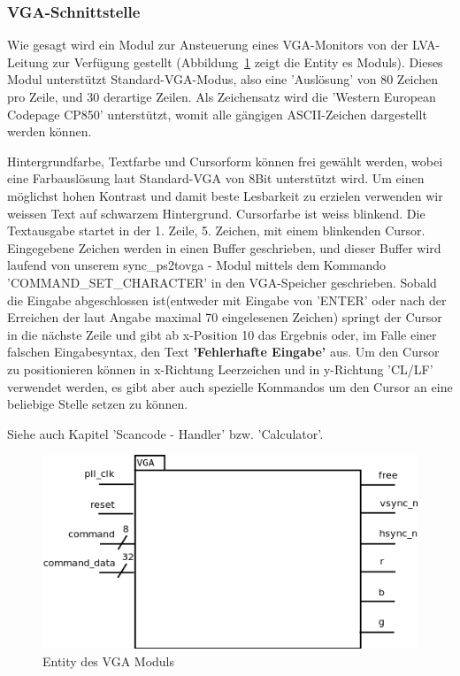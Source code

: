 \subsubsection{VGA-Schnittstelle}

Wie gesagt wird ein Modul zur Ansteuerung eines VGA-Monitors von der LVA-Leitung zur Verfügung gestellt (Abbildung~\ref{fig:entity_vga} zeigt die Entity es Moduls). Dieses Modul unterstützt Standard-VGA-Modus, also eine 'Auslösung' von 80 Zeichen pro Zeile, und 30 derartige Zeilen. Als Zeichensatz wird die 'Western European Codepage CP850' unterstützt, womit alle gängigen ASCII-Zeichen dargestellt werden können.

Hintergrundfarbe, Textfarbe und Cursorform können frei gewählt werden, wobei eine Farbauslösung laut Standard-VGA von 8Bit unterstützt wird. Um einen möglichst hohen Kontrast und damit beste Lesbarkeit zu erzielen verwenden wir weissen Text auf schwarzem Hintergrund. Cursorfarbe ist weiss blinkend.
Die Textausgabe startet in der 1. Zeile, 5. Zeichen, mit einem blinkenden Cursor. Eingegebene Zeichen werden in einen Buffer geschrieben, und dieser Buffer wird laufend von unserem sync\_ps2tovga - Modul mittels dem Kommando 'COMMAND\_SET\_CHARACTER' in den VGA-Speicher geschrieben. Sobald die Eingabe abgeschlossen 	ist(entweder mit Eingabe von 'ENTER' oder nach der Erreichen der laut Angabe maximal 70 eingelesenen Zeichen) springt der Cursor in die nächste Zeile und gibt ab x-Position 10 das Ergebnis oder, im Falle einer falschen Eingabesyntax, den Text \textbf{'Fehlerhafte Eingabe'} aus. Um den Cursor zu positionieren können in x-Richtung Leerzeichen und in y-Richtung 'CL/LF' verwendet werden, es gibt aber auch spezielle Kommandos um den Cursor an eine beliebige Stelle setzen zu können.

Siehe auch Kapitel 'Scancode - Handler' bzw. 'Calculator'.

\begin{figure}[!ht]
	\centering
	\includegraphics[scale=0.3]{figures/entity_vga.png} 
	\caption{Entity des VGA Moduls}
	\label{fig:entity_vga}
\end{figure}

